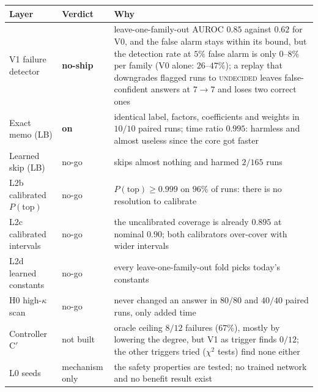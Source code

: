 \documentclass[11pt]{article}
\theoremstyle{plain}
\theoremstyle{definition}
\theoremstyle{remark}
\begin{document}
\begin{center}\small
\begin{tabular}{@{}L{3.1cm}L{3.0cm}L{6.6cm}@{}}
\toprule
Layer & Verdict & Why\\\midrule
V1 failure detector & \textbf{no-ship} & leave-one-family-out AUROC $0.85$ against $0.62$ for V0, and the false alarm stays within its bound, but the detection rate at $5\%$ false alarm is only $0$--$8\%$ per family (V0 alone: $26$--$47\%$); a replay that downgrades flagged runs to \textsc{undecided} leaves false-confident answers at $7\to7$ and loses two correct ones\\
Exact memo (LB) & \textbf{on} & identical label, factors, coefficients and weights in $10/10$ paired runs; time ratio $0.995$: harmless and almost useless since the core got faster\\
Learned skip (LB) & no-go & skips almost nothing and harmed $2/165$ runs\\
L2b calibrated $P(\text{top})$ & no-go & $P(\text{top})\ge0.999$ on $96\%$ of runs: there is no resolution to calibrate\\
L2c calibrated intervals & no-go & the uncalibrated coverage is already $0.895$ at nominal $0.90$; both calibrators over-cover with wider intervals\\
L2d learned constants & no-go & every leave-one-family-out fold picks today's constants\\
H0 high-$\kappa$ scan & no-go & never changed an answer in $80/80$ and $40/40$ paired runs, only added time\\
Controller C$'$ & not built & oracle ceiling $8/12$ failures ($67\%$), mostly by lowering the degree, but V1 as trigger finds $0/12$; the other triggers tried ($\chi^2$ tests) find none either\\
L0 seeds & mechanism only & the safety properties are tested; no trained network and no benefit result exist\\
\bottomrule
\end{tabular}
\end{center}
\end{document}
